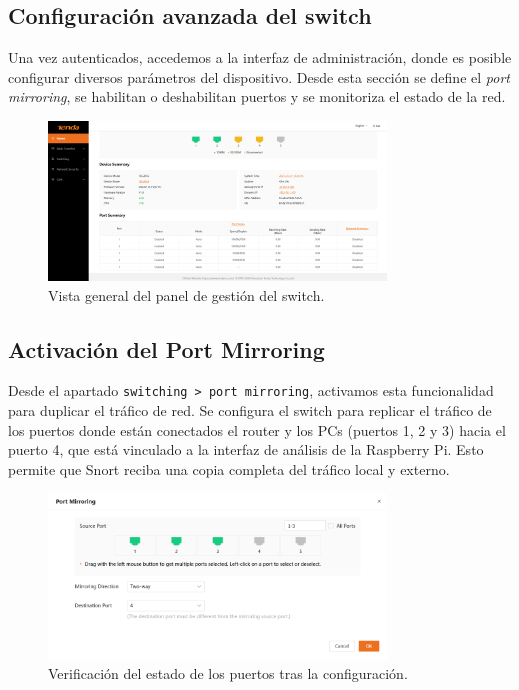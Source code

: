 \documentclass[11pt,a4paper,twoside]{report}
\begin{document}
\pagebreak

\subsection*{Configuración avanzada del switch}

Una vez autenticados, accedemos a la interfaz de administración, donde es posible configurar diversos parámetros del dispositivo. Desde esta sección se define el \textit{port mirroring}, se habilitan o deshabilitan puertos y se monitoriza el estado de la red.

\begin{figure}[H]
	\centering
	\includegraphics[width=0.8\textwidth]{pruebas_config/7-pagina_tenda.png}
	\caption{Vista general del panel de gestión del switch.}
\end{figure}

\subsection*{Activación del Port Mirroring}

Desde el apartado \texttt{switching > port mirroring}, activamos esta funcionalidad para duplicar el tráfico de red. Se configura el switch para replicar el tráfico de los puertos donde están conectados el router y los PCs (puertos 1, 2 y 3) hacia el puerto 4, que está vinculado a la interfaz de análisis de la Raspberry Pi. Esto permite que Snort reciba una copia completa del tráfico local y externo.

\begin{figure}[H]
	\centering
	\includegraphics[width=0.8\textwidth]{pruebas_config/9-asignacion_port.png}
	\caption{Verificación del estado de los puertos tras la configuración.}
\end{figure}
\end{document}
